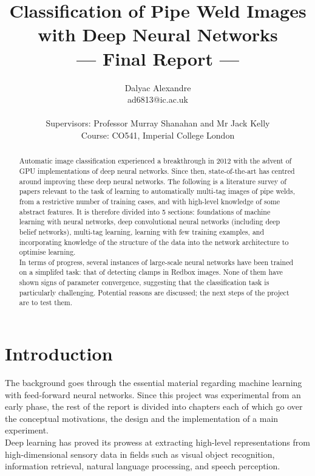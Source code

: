 \documentclass[a4paper,11pt]{article}
\title{Classification of Pipe Weld Images with Deep Neural Networks\\\Large{--- Final Report ---}}
\author{Dalyac Alexandre\\
       ad6813@ic.ac.uk\\ \\
       \small{Supervisors: Professor Murray Shanahan and Mr Jack Kelly}\\
       \small{Course: CO541, Imperial College London}
}
\begin{document}
\maketitle

\begin{abstract}

{
Automatic image classification experienced a breakthrough in 2012 with the advent of GPU implementations of deep neural networks. Since then, state-of-the-art has centred around improving these deep neural networks. The following is a literature survey of papers relevant to the task of learning to automatically multi-tag images of pipe welds, from a restrictive number of training cases, and with high-level knowledge of some abstract features. It is therefore divided into 5 sections: foundations of machine learning with neural networks, deep convolutional neural networks (including deep belief networks), multi-tag learning, learning with few training examples, and incorporating knowledge of the structure of the data into the network architecture to optimise learning.\\

In terms of progress, several instances of large-scale neural networks have been trained on a simplifed task: that of detecting clamps in Redbox images. None of them have shown signs of parameter convergence, suggesting that the classification task is particularly challenging. Potential reasons are discussed; the next steps of the project are to test them.
}
\end{abstract}

\clearpage
\tableofcontents

\clearpage

\section{Introduction}

The background goes through the essential material regarding machine learning with feed-forward neural networks. Since this project was experimental from an early phase, the rest of the report is divided into chapters each of which go over the conceptual motivations, the design and the implementation of a main experiment. \\

Deep learning has proved its prowess at extracting high-level representations from high-dimensional sensory data in fields such as visual object recognition, information retrieval, natural language processing, and speech perception. \\
\end{document}
